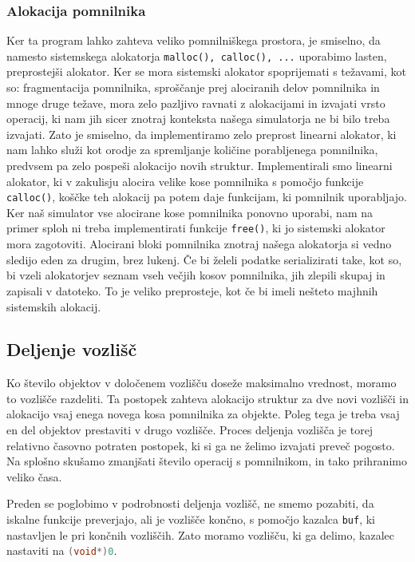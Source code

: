 \documentclass[a4paper,12pt]{article}
\begin{document}
\subsubsection{Alokacija pomnilnika}

Ker ta program lahko zahteva veliko pomnilniškega prostora, je smiselno, da namesto sistemskega
alokatorja \lstinline|malloc(), calloc(), ...| uporabimo lasten, preprostejši alokator.
Ker se mora sistemski alokator spoprijemati s težavami, kot so: fragmentacija pomnilnika, sproščanje
prej alociranih delov pomnilnika in mnoge druge težave, mora zelo pazljivo ravnati z alokacijami in
izvajati vrsto operacij, ki nam jih sicer znotraj konteksta našega simulatorja
ne bi bilo treba izvajati. Zato je smiselno, da implementiramo zelo preprost linearni alokator, ki nam lahko služi kot orodje
za spremljanje količine porabljenega pomnilnika, predvsem pa zelo pospeši alokacijo novih struktur.
Implementirali smo linearni alokator, ki v zakulisju alocira velike kose pomnilnika s pomočjo
funkcije \lstinline|calloc()|, koščke teh alokacij pa potem daje funkcijam, ki pomnilnik uporabljajo.
Ker naš simulator vse alocirane kose pomnilnika ponovno uporabi, nam na primer sploh ni treba implementirati
funkcije \lstinline|free()|, ki jo sistemski alokator mora zagotoviti. Alocirani bloki pomnilnika znotraj našega
alokatorja si vedno sledijo eden za drugim, brez lukenj. Če bi želeli podatke serializirati take, kot so,
bi vzeli alokatorjev seznam vseh večjih kosov pomnilnika, jih zlepili skupaj in zapisali v datoteko.
To je veliko preprosteje, kot če bi imeli nešteto majhnih sistemskih alokacij.

\subsection{Deljenje vozlišč}
Ko število objektov v določenem vozlišču doseže maksimalno vrednost, moramo to vozlišče
razdeliti. Ta postopek zahteva alokacijo struktur za dve novi vozlišči in alokacijo vsaj enega novega
kosa pomnilnika za objekte. Poleg tega je treba vsaj en del objektov prestaviti v drugo vozlišče.
Proces deljenja vozlišča je torej relativno časovno potraten postopek, ki si ga ne želimo izvajati
preveč pogosto. Na splošno skušamo zmanjšati število operacij s pomnilnikom, in tako prihranimo veliko
časa.

Preden se poglobimo v podrobnosti deljenja vozlišč, ne smemo pozabiti, da iskalne funkcije preverjajo,
ali je vozlišče končno, s pomočjo kazalca \lstinline|buf|, ki nastavljen le pri končnih vozliščih. 
Zato moramo vozlišču, ki ga delimo, kazalec nastaviti na \lstinline[language=C]|(void*)0|.
\end{document}
